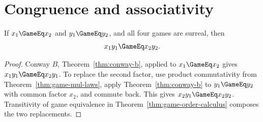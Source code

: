 \section{Congruence and associativity}

\begin{theorem}
  \label{thm:game-mul-congr}
  \leanok
  If \(x_1\GameEq x_2\) and \(y_1\GameEq y_2\), and all four games are surreal, then
  \[
    x_1y_1\GameEq x_2y_2.
  \]
\end{theorem}
\begin{proof}
  \leanok
  Conway \(B\), Theorem~\ref{thm:conway-b}, applied to
  \(x_1\GameEq x_2\) gives
  \(x_1y_1\GameEq x_2y_1\).  To replace the second factor, use product
  commutativity from Theorem~\ref{thm:game-mul-laws}, apply
  Theorem~\ref{thm:conway-b} to \(y_1\GameEq y_2\) with common factor \(x_2\),
  and commute back.  This gives
  \(x_2y_1\GameEq x_2y_2\).  Transitivity of game equivalence in
  Theorem~\ref{thm:game-order-calculus} composes the two replacements.
\end{proof}

